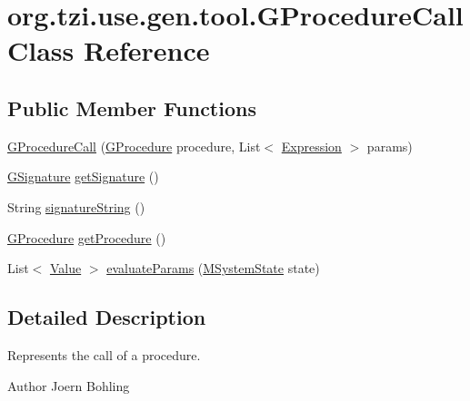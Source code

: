 \hypertarget{classorg_1_1tzi_1_1use_1_1gen_1_1tool_1_1_g_procedure_call}{\section{org.\-tzi.\-use.\-gen.\-tool.\-G\-Procedure\-Call Class Reference}
\label{classorg_1_1tzi_1_1use_1_1gen_1_1tool_1_1_g_procedure_call}
}
\subsection*{Public Member Functions}
\begin{DoxyCompactItemize}
\item 
\hyperlink{classorg_1_1tzi_1_1use_1_1gen_1_1tool_1_1_g_procedure_call_a2f51cb05ff04047ef3492e19ef1ad2e9}{G\-Procedure\-Call} (\hyperlink{classorg_1_1tzi_1_1use_1_1gen_1_1assl_1_1statics_1_1_g_procedure}{G\-Procedure} procedure, List$<$ \hyperlink{classorg_1_1tzi_1_1use_1_1uml_1_1ocl_1_1expr_1_1_expression}{Expression} $>$ params)
\item 
\hyperlink{classorg_1_1tzi_1_1use_1_1gen_1_1tool_1_1_g_signature}{G\-Signature} \hyperlink{classorg_1_1tzi_1_1use_1_1gen_1_1tool_1_1_g_procedure_call_afbbe5b2ffc72d5302e8a69097335499e}{get\-Signature} ()
\item 
String \hyperlink{classorg_1_1tzi_1_1use_1_1gen_1_1tool_1_1_g_procedure_call_aad342ab52bc141610c30d961d6304c2a}{signature\-String} ()
\item 
\hyperlink{classorg_1_1tzi_1_1use_1_1gen_1_1assl_1_1statics_1_1_g_procedure}{G\-Procedure} \hyperlink{classorg_1_1tzi_1_1use_1_1gen_1_1tool_1_1_g_procedure_call_a18b1cf0cc2f6619f06375f89a58a3f05}{get\-Procedure} ()
\item 
List$<$ \hyperlink{classorg_1_1tzi_1_1use_1_1uml_1_1ocl_1_1value_1_1_value}{Value} $>$ \hyperlink{classorg_1_1tzi_1_1use_1_1gen_1_1tool_1_1_g_procedure_call_a971e2b84d468684f17cd1a69cd8062c2}{evaluate\-Params} (\hyperlink{classorg_1_1tzi_1_1use_1_1uml_1_1sys_1_1_m_system_state}{M\-System\-State} state)
\end{DoxyCompactItemize}


\subsection{Detailed Description}
Represents the call of a procedure. \begin{DoxyAuthor}{Author}
Joern Bohling 
\end{DoxyAuthor}


